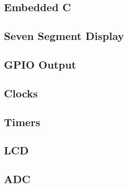 \documentclass[journal]{IEEEtran}
\begin{document}
\subsection{Embedded C}

\subsection{Seven Segment Display}

\subsection{GPIO Output}

\subsection{Clocks}

\subsection{Timers}

\subsection{LCD}

\subsection{ADC}

%
\end{document}
